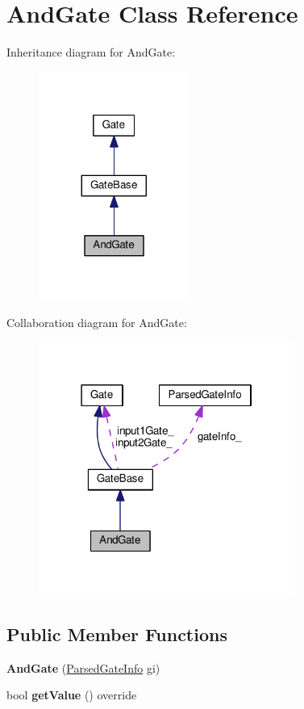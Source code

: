 \hypertarget{classAndGate}{}\section{And\+Gate Class Reference}
\label{classAndGate}


Inheritance diagram for And\+Gate\+:
\nopagebreak
\begin{figure}[H]
\begin{center}
\leavevmode
\includegraphics[width=140pt]{classAndGate__inherit__graph}
\end{center}
\end{figure}


Collaboration diagram for And\+Gate\+:
\nopagebreak
\begin{figure}[H]
\begin{center}
\leavevmode
\includegraphics[width=238pt]{classAndGate__coll__graph}
\end{center}
\end{figure}
\subsection*{Public Member Functions}
\begin{DoxyCompactItemize}
\item 
{\bfseries And\+Gate} (\hyperlink{structParsedGateInfo}{Parsed\+Gate\+Info} gi)\hypertarget{classAndGate_aa235734cda4540b88abbd8351cc19431}{}\label{classAndGate_aa235734cda4540b88abbd8351cc19431}

\item 
bool {\bfseries get\+Value} () override\hypertarget{classAndGate_acc5debba56f93c67859d6acbdd1467cb}{}\label{classAndGate_acc5debba56f93c67859d6acbdd1467cb}

\end{DoxyCompactItemize}
